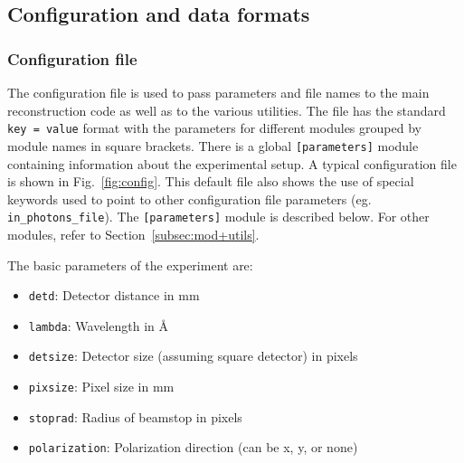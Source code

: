 \documentclass[]{iucr}              %
\begin{document}
\subsection{Configuration and data formats}\label{subsec:formats}
\subsubsection{Configuration file}\label{subsubsec:config}
The configuration file is used to pass parameters and file names to the main reconstruction code as well as to the various utilities. The file has the standard \texttt{key = value} format with the parameters for different modules grouped by module names in square brackets. There is a global \texttt{[parameters]} module containing information about the experimental setup. A typical configuration file is shown in Fig.~\ref{fig:config}. This default file also shows the use of special keywords used to point to other configuration file parameters (eg. \texttt{in\_photons\_file}). The \texttt{[parameters]} module is described below. For other modules, refer to Section~\ref{subsec:mod+utils}.

The basic parameters of the experiment are:
\begin{itemize}
\item \texttt{detd}: Detector distance in mm
\item \texttt{lambda}: Wavelength in \AA
\item \texttt{detsize}: Detector size (assuming square detector) in pixels
\item \texttt{pixsize}: Pixel size in mm
\item \texttt{stoprad}: Radius of beamstop in pixels
\item \texttt{polarization}: Polarization direction (can be x, y, or none)
\end{itemize}
\end{document}

